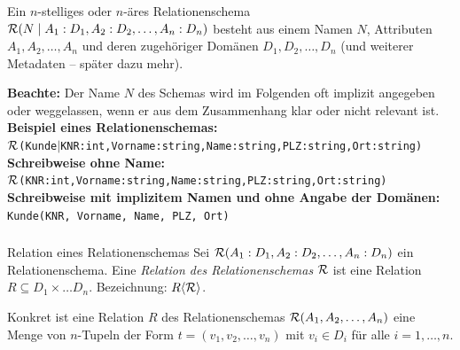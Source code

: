 \begin{frame}\frametitle{\insertsection}
\framesubtitle{\insertsubsection}
\begin{definition}[Relationenschema]\label{def:schema}
	Ein $n$-stelliges oder $n$-\"ares Relationenschema $\mathcal{R}(N\mid A_1:D_1,A_2:D_2,\ldots,A_n:D_n)$ besteht aus einem Namen 
	$N$, Attributen $A_1, A_2,\ldots, A_n$ und deren zugehöriger Domänen $D_1, D_2, \ldots, D_n$ (und weiterer Metadaten -- 
	sp\"ater dazu mehr). 
\end{definition}
\pause
\textbf{Beachte:} Der Name $N$ des Schemas wird im Folgenden oft implizit angegeben oder weggelassen, wenn er aus dem 
Zusammenhang klar oder nicht relevant ist.\\[5pt]
\onslide \pause
\textbf{Beispiel eines Relationenschemas:}\\
\texttt{$\mathcal{R}$(Kunde$\mid$KNR:int,Vorname:string,Name:string,PLZ:string,Ort:string)}\\[5pt]
\textbf{Schreibweise ohne Name:}\\
\texttt{$\mathcal{R}$(KNR:int,Vorname:string,Name:string,PLZ:string,Ort:string)}\\[5pt]
\textbf{Schreibweise mit implizitem Namen und ohne Angabe der Domänen:}\\
\texttt{Kunde(KNR, Vorname, Name, PLZ, Ort)}
\end{frame}

\begin{frame}\frametitle{\insertsection}
\framesubtitle{\insertsubsection}
\begin{definition}{Relation eines Relationenschemas}\label{def:rel}
	Sei $\mathcal{R}(A_1:D_1,A_2:D_2,\ldots,A_n:D_n)$ ein Relationenschema. 
	Eine \emph{Relation des Relationenschemas} $\mathcal{R}$ ist eine Relation  
  $R\subseteq D_1\times\ldots D_n$. Bezeichnung: $R\langle\mathcal{R}\rangle$.
\end{definition}
\onslide\pause
\abs
Konkret ist eine Relation $R$ des Relationenschemas $\mathcal{R}(A_1,A_2,\dots,A_n)$ eine Menge von 
$n$-Tupeln der Form $t=(v_1,v_2,\ldots,v_n)$ mit $v_i \in D_i$ f\"ur alle $i=1,\ldots,n$.
\end{frame}

